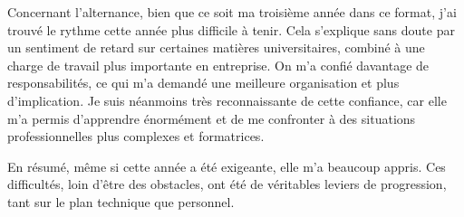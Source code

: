 Concernant l’alternance, bien que ce soit ma troisième année dans ce format, j’ai trouvé le rythme cette année plus difficile à tenir. Cela s’explique sans doute par un sentiment de retard sur certaines matières universitaires, combiné à une charge de travail plus importante en entreprise. On m’a confié davantage de responsabilités, ce qui m’a demandé une meilleure organisation et plus d’implication. Je suis néanmoins très reconnaissante de cette confiance, car elle m’a permis d’apprendre énormément et de me confronter à des situations professionnelles plus complexes et formatrices.

En résumé, même si cette année a été exigeante, elle m’a beaucoup appris. Ces difficultés, loin d’être des obstacles, ont été de véritables leviers de progression, tant sur le plan technique que personnel.

